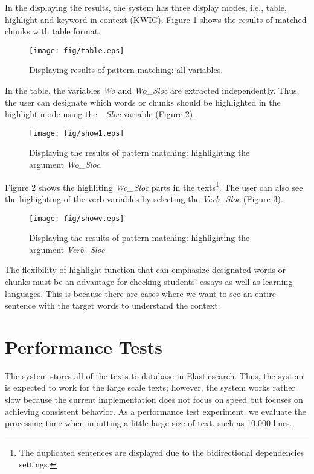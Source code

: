 \documentclass[conference]{IEEEtran}
\begin{document}
In the displaying the results, the system has three display modes, i.e.,
table, highlight and keyword in context (KWIC).
Figure \ref{fig:table} shows the results of matched chunks with table format.

\begin{figure}[htbp]
  \centerline{\texttt{[image: fig/table.eps]}}
  \caption{Displaying results of pattern matching: all variables.}
  \label{fig:table}
\end{figure}

In the table, the variables {\it Wo} and {\it Wo\_Sloc} are extracted
independently. Thus, the user can designate which words or chunks should be highlighted in
the highlight mode using the {\it \_Sloc} variable (Figure \ref{fig:show1}).

\begin{figure}[htbp]
  \centerline{\texttt{[image: fig/show1.eps]}}
  \caption{Displaying the results of pattern matching: highlighting the argument {\it Wo\_Sloc}.}
  \label{fig:show1}
\end{figure}

Figure \ref{fig:show1} shows the highliting {\it Wo\_Sloc} parts in the texts\footnote{The duplicated
  sentences are displayed due to the bidirectional dependencies settings.}.
The user can also see the highighting of the verb variables by selecting the {\it Verb\_Sloc} (Figure \ref{fig:showv}).

\begin{figure}[htbp]
  \centerline{\texttt{[image: fig/showv.eps]}}
  \caption{Displaying the results of pattern matching: highlighting the argument {\it Verb\_Sloc}.}
  \label{fig:showv}
\end{figure}

The flexibility of highlight function that can emphasize designated words or chunks must be an advantage for checking students' essays as well as learning languages.
This is because there are cases where we want to see an entire sentence with the target words to understand the context. 

\section{Performance Tests}
\label{sec:experiment}
The system stores all of the texts to database in Elasticsearch. Thus,
the system is expected to work for the large scale texts; however, the
system works rather slow because the current implementation does not
focus on speed but focuses on achieving consistent behavior.  As a
performance test experiment, we evaluate the processing time when
inputting a little large size of text, such as 10,000 lines.
\end{document}
